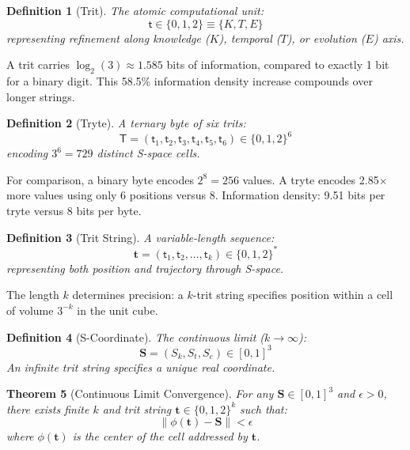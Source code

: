 \documentclass[twocolumn,10pt]{article}
\newtheorem{theorem}{Theorem}[section]
\newtheorem{definition}[theorem]{Definition}
\theoremstyle{remark}
\newcommand{\Sk}{S_k}
\newcommand{\St}{S_t}
\newcommand{\Se}{S_e}
\newcommand{\Scoord}{\mathbf{S}}
\newcommand{\tmark}{\mathsf{t}}
\newcommand{\tryte}{\mathsf{T}}
\begin{document}
\begin{definition}[Trit]
The atomic computational unit:
\begin{equation}
\tmark \in \{0, 1, 2\} \equiv \{K, T, E\}
\end{equation}
representing refinement along knowledge ($K$), temporal ($T$), or evolution ($E$) axis.
\end{definition}

A trit carries $\log_2(3) \approx 1.585$ bits of information, compared to exactly 1 bit for a binary digit. This 58.5\% information density increase compounds over longer strings.

\begin{definition}[Tryte]
A ternary byte of six trits:
\begin{equation}
\tryte = (\tmark_1, \tmark_2, \tmark_3, \tmark_4, \tmark_5, \tmark_6) \in \{0,1,2\}^6
\end{equation}
encoding $3^6 = 729$ distinct S-space cells.
\end{definition}

For comparison, a binary byte encodes $2^8 = 256$ values. A tryte encodes 2.85$\times$ more values using only 6 positions versus 8. Information density: 9.51 bits per tryte versus 8 bits per byte.

\begin{definition}[Trit String]
A variable-length sequence:
\begin{equation}
\mathbf{t} = (\tmark_1, \tmark_2, \ldots, \tmark_k) \in \{0,1,2\}^*
\end{equation}
representing both position and trajectory through S-space.
\end{definition}

The length $k$ determines precision: a $k$-trit string specifies position within a cell of volume $3^{-k}$ in the unit cube.

\begin{definition}[S-Coordinate]
The continuous limit ($k \to \infty$):
\begin{equation}
\Scoord = (\Sk, \St, \Se) \in [0,1]^3
\end{equation}
An infinite trit string specifies a unique real coordinate.
\end{definition}

\begin{theorem}[Continuous Limit Convergence]
\label{thm:continuous}
For any $\Scoord \in [0,1]^3$ and $\epsilon > 0$, there exists finite $k$ and trit string $\mathbf{t} \in \{0,1,2\}^k$ such that:
\begin{equation}
\|\phi(\mathbf{t}) - \Scoord\| < \epsilon
\end{equation}
where $\phi(\mathbf{t})$ is the center of the cell addressed by $\mathbf{t}$.
\end{theorem}
\end{document}
